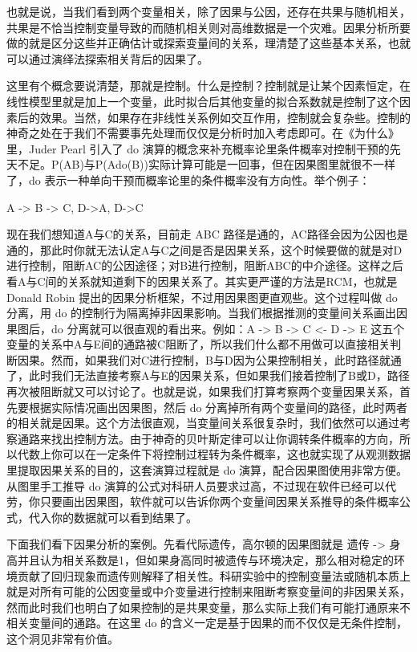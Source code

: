 \documentclass[]{tufte-book}
\begin{document}
也就是说，当我们看到两个变量相关，除了因果与公因，还存在共果与随机相关，共果是不恰当控制变量导致的而随机相关则对高维数据是一个灾难。因果分析所要做的就是区分这些并正确估计或探索变量间的关系，理清楚了这些基本关系，也就可以通过演绎法探索相关背后的因果了。

这里有个概念要说清楚，那就是控制。什么是控制？控制就是让某个因素恒定，在线性模型里就是加上一个变量，此时拟合后其他变量的拟合系数就是控制了这个因素后的效果。当然，如果存在非线性关系例如交互作用，控制就会复杂些。控制的神奇之处在于我们不需要事先处理而仅仅是分析时加入考虑即可。在《为什么》里，Juder Pearl 引入了 do 演算的概念来补充概率论里条件概率对控制干预的先天不足。P(A\textbar B)与P(A\textbar do(B))实际计算可能是一回事，但在因果图里就很不一样了，do 表示一种单向干预而概率论里的条件概率没有方向性。举个例子：

A -\textgreater{} B -\textgreater{} C, D-\textgreater A, D-\textgreater C

现在我们想知道A与C的关系，目前走 ABC 路径是通的，AC路径会因为公因也是通的，那此时你就无法认定A与C之间是否是因果关系，这个时候要做的就是对D进行控制，阻断AC的公因途径；对B进行控制，阻断ABC的中介途径。这样之后看A与C间的关系就知道剩下的因果关系了。其实更严谨的方法是RCM，也就是 Donald Robin 提出的因果分析框架，不过用因果图更直观些。这个过程叫做 do 分离，用 do 的控制行为隔离掉非因果影响。当我们根据推测的变量间关系画出因果图后，do 分离就可以很直观的看出来。例如：A -\textgreater{} B -\textgreater{} C \textless- D -\textgreater{} E 这五个变量的关系中A与E间的通路被C阻断了，所以我们什么都不用做可以直接相关判断因果。然而，如果我们对C进行控制，B与D因为公果控制相关，此时路径就通了，此时我们无法直接考察A与E的因果关系，但如果我们接着控制了B或D，路径再次被阻断就又可以讨论了。也就是说，如果我们打算考察两个变量因果关系，首先要根据实际情况画出因果图，然后 do 分离掉所有两个变量间的路径，此时两者的相关就是因果。这个方法很直观，当变量间关系很复杂时，我们依然可以通过考察通路来找出控制方法。由于神奇的贝叶斯定律可以让你调转条件概率的方向，所以代数上你可以在一定条件下将控制过程转为条件概率，这也就实现了从观测数据里提取因果关系的目的，这套演算过程就是 do 演算，配合因果图使用非常方便。从图里手工推导 do 演算的公式对科研人员要求过高，不过现在软件已经可以代劳，你只要画出因果图，软件就可以告诉你两个变量间因果关系推导的条件概率公式，代入你的数据就可以看到结果了。

下面我们看下因果分析的案例。先看代际遗传，高尔顿的因果图就是 遗传 -\textgreater{} 身高并且认为相关系数是1，但如果身高同时被遗传与环境决定，那么相对稳定的环境贡献了回归现象而遗传则解释了相关性。科研实验中的控制变量法或随机本质上就是对所有可能的公因变量或中介变量进行控制来阻断考察变量间的非因果关系，然而此时我们也明白了如果控制的是共果变量，那么实际上我们有可能打通原来不相关变量间的通路。在这里 do 的含义一定是基于因果的而不仅仅是无条件控制，这个洞见非常有价值。
\end{document}
